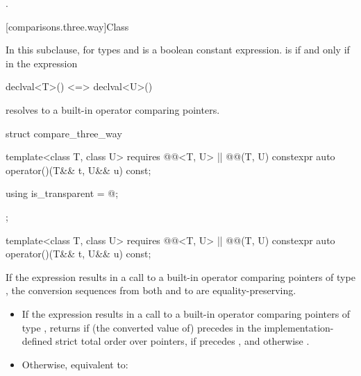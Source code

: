 \begin{itemdescr}
\pnum
\returns
{}.
\end{itemdescr}

[comparisons.three.way]{Class }

\pnum
In this subclause, 
for types  and  is a boolean constant expression.
 is 
if and only if \tcode{<=>} in the expression
\begin{codeblock}
declval<T>() <=> declval<U>()
\end{codeblock}
resolves to a built-in operator comparing pointers.

%
\begin{codeblock}
struct compare_three_way {
  template<class T, class U>
    requires @@<T, U> || @@(T, U)
    constexpr auto operator()(T&& t, U&& u) const;

  using is_transparent = @\unspec@;
};
\end{codeblock}

\begin{itemdecl}
template<class T, class U>
  requires @@<T, U> || @@(T, U)
  constexpr auto operator()(T&& t, U&& u) const;
\end{itemdecl}

\begin{itemdescr}
\pnum
\expects
If the expression  results in
a call to a built-in operator \tcode{<=>} comparing pointers of type ,
the conversion sequences from both  and  to 
are equality-preserving.

\pnum
\effects
\begin{itemize}
\item
  If the expression  results in
  a call to a built-in operator \tcode{<=>} comparing pointers of type ,
  returns 
  if (the converted value of)  precedes 
  in the implementation-defined strict total order
  over pointers,
  if  precedes , and
  otherwise .
\item
  Otherwise, equivalent to: 
\end{itemize}
\end{itemdescr}

